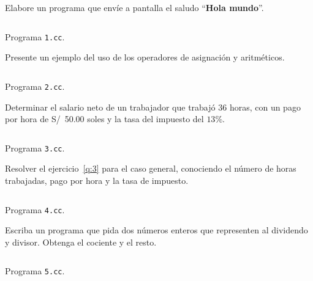 \documentclass[spanish,addpoints,answers,a4paper]{exam}
\begin{document}
\begin{questions}

\question Elabore un programa que envíe a pantalla el saludo ``\textbf{Hola mundo}''.

\begin{solution}
	\begin{listing}[H]
		\footnotesize
		\inputminted{cpp}{1.cc}
		\caption{Programa \texttt{1.cc}.}
		\label{lst:1.1}
	\end{listing}
\end{solution}

\question Presente un ejemplo del uso de los operadores de asignación y aritméticos.

\begin{solution}
	\begin{listing}[H]
		\footnotesize
		\inputminted{cpp}{2.cc}
		\caption{Programa \texttt{2.cc}.}
		\label{lst:1.2}
	\end{listing}
\end{solution}

\question Determinar el salario neto de un trabajador que trabajó $36$ horas, con un pago por hora de \SI{50.00}[S/]{} soles y la tasa del impuesto del $13$\%.\label{q:3}

\begin{solution}
	\begin{listing}[H]
		\footnotesize
		\inputminted{cpp}{3.cc}
		\caption{Programa \texttt{3.cc}.}
		\label{lst:1.3}
	\end{listing}
\end{solution}

\question Resolver el ejercicio~\ref{q:3} para el caso general, conociendo el número de horas trabajadas, pago por hora y la tasa de impuesto.

\begin{solution}
	\begin{listing}[H]
		\footnotesize
		\inputminted{cpp}{4.cc}
		\caption{Programa \texttt{4.cc}.}
		\label{lst:1.4}
	\end{listing}
\end{solution}

\question Escriba un programa que pida dos números enteros que representen al dividendo y divisor. Obtenga el cociente y el resto.

\begin{solution}
	\begin{listing}[H]
		\footnotesize
		\inputminted{cpp}{5.cc}
		\caption{Programa \texttt{5.cc}.}
		\label{lst:1.5}
	\end{listing}
\end{solution}


\end{questions}
\end{document}
